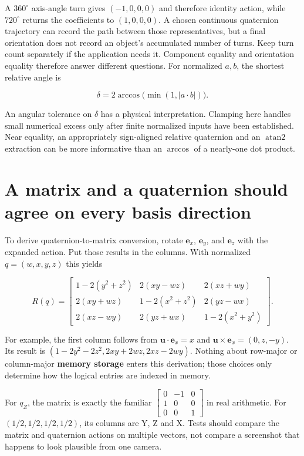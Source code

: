 A \(360^\circ\) axis-angle turn gives \((-1,0,0,0)\) and therefore identity action, while \(720^\circ\) returns the coefficients to \((1,0,0,0)\). A chosen continuous quaternion trajectory can record the path between those representatives, but a final orientation does not record an object's accumulated number of turns. Keep turn count separately if the application needs it. Component equality and orientation equality therefore answer different questions. For normalized \(a,b\), the shortest relative angle is

\[
\delta=2\arccos\bigl(\min(1,|a\cdot b|)\bigr).
\]

An angular tolerance on \(\delta\) has a physical interpretation. Clamping here handles small numerical excess only after finite normalized inputs have been established. Near equality, an appropriately sign-aligned relative quaternion and an \(\operatorname{atan2}\) extraction can be more informative than an \(\arccos\) of a nearly-one dot product.

\section{A matrix and a quaternion should agree on every basis direction}\label{01-foundations-i-ch019-a-matrix-and-a-quaternion-should-agree-on-every-basis-direction}

To derive quaternion-to-matrix conversion, rotate \(\mathbf e_x\), \(\mathbf e_y\), and \(\mathbf e_z\) with the expanded action. Put those results in the columns. With normalized \(q=(w,x,y,z)\) this yields

\[
R(q)=\begin{bmatrix}
1-2(y^2+z^2)&2(xy-wz)&2(xz+wy)\\
2(xy+wz)&1-2(x^2+z^2)&2(yz-wx)\\
2(xz-wy)&2(yz+wx)&1-2(x^2+y^2)
\end{bmatrix}.
\]

For example, the first column follows from \(\mathbf u\cdot\mathbf e_x=x\) and \(\mathbf u\times\mathbf e_x=(0,z,-y)\). Its result is \((1-2y^2-2z^2,2xy+2wz,2xz-2wy)\). Nothing about row-major or column-major \textbf{memory storage} enters this derivation; those choices only determine how the logical entries are indexed in memory.

For \(q_Z\), the matrix is exactly the familiar \(\begin{bmatrix}0&-1&0\\1&0&0\\0&0&1\end{bmatrix}\) in real arithmetic. For \((1/2,1/2,1/2,1/2)\), its columns are Y, Z and X. Tests should compare the matrix and quaternion actions on multiple vectors, not compare a screenshot that happens to look plausible from one camera.


